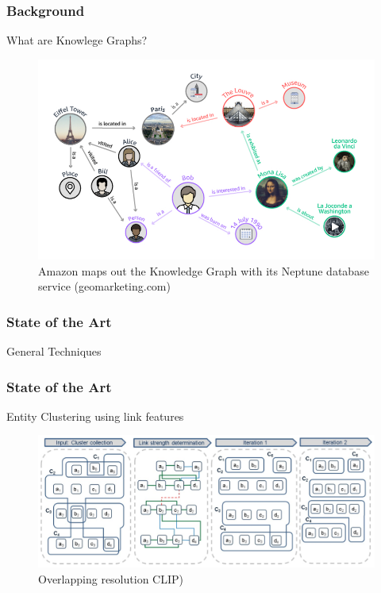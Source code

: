 \documentclass{beamer}
\begin{document}

\begin{frame}
\frametitle{Background}

\textcolor{RWTHblue}{What are Knowlege Graphs?}


\begin{figure}[h!]
  \includegraphics[width=1 \linewidth]{Amazon-Neptune-Knowledge-Graph.jpg}
  \caption{Amazon maps out the Knowledge Graph with its Neptune database service (geomarketing.com)}
\end{figure}

\end{frame}


\begin{frame}
\frametitle{State of the Art}
\begin{center}
 \Large{\textcolor{RWTHblue}{General Techniques}}
\end{center}
\end{frame}

\begin{frame}
\frametitle{State of the Art}
\begin{center}
 \Large{\textcolor{RWTHblue}{Entity Clustering using link features}}
 \begin{figure}[h!]
  \includegraphics[width=1 \linewidth]{clip_overlap_resolution.png}
  \caption{Overlapping resolution CLIP)}
\end{figure}
\end{center}
\end{frame}
\end{document}
